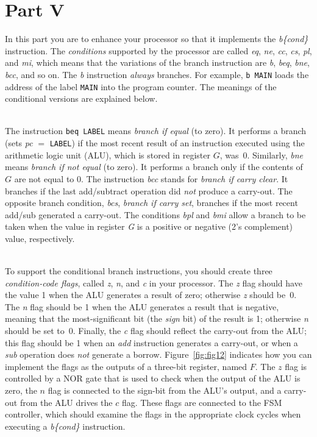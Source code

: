 \documentclass[epsfig,10pt,fullpage]{article} \addtolength{\textwidth}{1.5in}
\begin{document}
\section*{Part V}
In this part you are to enhance your processor so that it implements the {\it b\{cond\}}
instruction.  The {\it conditions} supported by the processor are called 
{\it eq}, {\it ne}, {\it cc}, {\it cs}, {\it pl}, and {\it mi}, which means that the variations 
of the branch instruction are {\it b}, {\it beq}, {\it bne}, {\it bcc}, and so on. The {\it b}
instruction {\it always} branches. For example, \texttt{b  MAIN} loads the address of the
label \texttt{MAIN} into the program counter. The meanings of the conditional versions are 
explained below.

~\\
\noindent
The instruction \texttt{beq  LABEL} means {\it branch if equal} (to zero). It performs a branch 
(sets {\it pc} $=$ \texttt{LABEL}) if the most recent result of an instruction 
executed using the arithmetic logic unit (ALU), which is stored in register $G$, was~0. 
Similarly, {\it bne} means {\it branch if not
equal} (to zero).  It performs a branch only if the contents of $G$ are not equal to 0.
The instruction {\it bcc} stands for {\it branch if carry clear}. It branches if the last
add/subtract operation did {\it not} produce a carry-out. The opposite branch condition, 
{\it bcs}, {\it branch if carry set}, branches if the most recent add/sub generated a 
carry-out. The conditions {\it bpl} and {\it bmi} allow a branch to be taken when the value 
in register {\it G} is a positive or negative (2's complement) value,
respectively. 

~\\
\noindent
To support the conditional branch instructions, you should create three
{\it condition-code flags}, called {\it z}, {\it n}, and {\it c} in your processor. 
The {\it z} flag should have the value 1 when the ALU generates a result of zero; 
otherwise {\it z} should be~0.  The {\it n} flag should be 1 when the ALU generates a 
result that is negative, meaning that the most-significant bit (the {\it sign} bit) of the
result is 1; 
otherwise {\it n} should be set to~0. Finally, the {\it c} flag should reflect the carry-out 
from the ALU; this flag should be 1 when an {\it add} instruction generates a carry-out, or 
when a {\it sub} operation does {\it not} generate a borrow. Figure~\ref{fig:fig12} 
indicates how you can implement the flags as the outputs of a three-bit
register, named $F$. The $z$ flag is controlled by a NOR gate that is 
used to check when the output of the ALU 
is zero, the $n$ flag is connected to the sign-bit from the ALU's output, and a carry-out 
from the ALU drives the $c$ flag. These flags are connected to the FSM controller, which 
should examine the flags in the appropriate clock cycles when executing a {\it b\{cond\}}
instruction.
\end{document}
